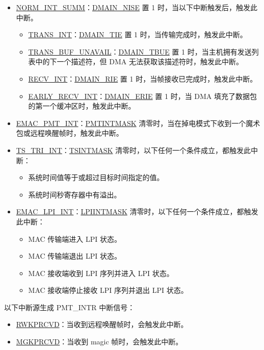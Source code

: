 \documentclass[main\_\_CN.tex]{subfiles}
\begin{document}
\begin{itemize}
\item \hyperref[regdesc:DMASTATUSREG]{NORM\_INT\_SUMM}：\hyperref[regdesc:DMAINENREG]{DMAIN\_NISE} 置 1 时，当以下中断触发后，触发此中断。
    \begin{itemize}
    \item \hyperref[regdesc:DMASTATUSREG]{TRANS\_INT}：\hyperref[regdesc:DMAINENREG]{DMAIN\_TIE} 置 1 时，当传输完成时，触发此中断。
    \item \hyperref[regdesc:DMASTATUSREG]{TRANS\_BUF\_UNAVAIL}：\hyperref[regdesc:DMAINENREG]{DMAIN\_TBUE} 置 1 时，当主机拥有发送列表中的下一个描述符，但 DMA 无法获取该描述符时，触发此中断。
    \item \hyperref[regdesc:DMASTATUSREG]{RECV\_INT}：\hyperref[regdesc:DMAINENREG]{DMAIN\_RIE} 置 1 时，当帧接收已完成时，触发此中断。
    \item \hyperref[regdesc:DMASTATUSREG]{EARLY\_RECV\_INT}：\hyperref[regdesc:DMAINENREG]{DMAIN\_ERIE} 置 1 时，当 DMA 填充了数据包的第一个缓冲区时，触发此中断。
    \end{itemize}

\item \hyperref[regdesc:DMASTATUSREG]{EMAC\_PMT\_INT}：\hyperref[regdesc:EMACINTMASKREG]{PMTINTMASK} 清零时，当在掉电模式下收到一个魔术包或远程唤醒帧时，触发此中断。

\item \hyperref[regdesc:DMASTATUSREG]{TS\_TRI\_INT}：\hyperref[regdesc:EMACINTMASKREG]{TSINTMASK} 清零时，以下任何一个条件成立，都触发此中断：
\begin{itemize}
\item 系统时间值等于或超过目标时间指定的值。
\item 系统时间秒寄存器中有溢出。
\end{itemize}

\item \hyperref[regdesc:DMASTATUSREG]{EMAC\_LPI\_INT}：\hyperref[regdesc:EMACINTMASKREG]{LPIINTMASK} 清零时，以下任何一个条件成立，都触发此中断：
\begin{itemize}
\item MAC 传输端进入 LPI 状态。
\item MAC 传输端退出 LPI 状态。
\item MAC 接收端收到 LPI 序列并进入 LPI 状态。
\item MAC 接收端停止接收 LPI 序列并退出 LPI 状态。
\end{itemize}
\end{itemize}

以下中断源生成 PMT\_INTR 中断信号：
\begin{itemize}
\item \hyperref[regdesc:PMTCSRREG]{RWKPRCVD}：当收到远程唤醒帧时，会触发此中断。
\item \hyperref[regdesc:PMTCSRREG]{MGKPRCVD}：当收到 magic 帧时，会触发此中断。
\end{itemize}
\end{document}
